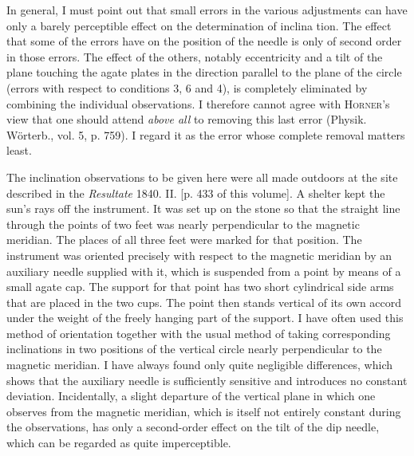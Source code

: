In general, I must point out that small errors in the various adjustments can have only a barely perceptible effect on the determination of inclina%
%
tion. The effect that some of the errors have on the position of the needle is only of second order in those errors. The effect of the others, notably eccentricity and a tilt of the plane touching the agate plates in the direction parallel to the plane of the circle (errors with respect to conditions 3, 6 and 4), is completely eliminated by combining the individual observations. I therefore cannot agree with \textsc{Horner}'s view that one should attend \textit{above all} to removing this last error (Physik. Wörterb., vol. 5, p. 759). I regard it as the error whose complete removal matters least.

The inclination observations to be given here were all made outdoors at the site described in the \textit{Resultate} 1840. II. [p. 433 of this volume]. A shelter kept the sun's rays off the instrument. It was set up on the stone so that the straight line through the points of two feet was nearly perpendicular to the magnetic meridian. The places of all three feet were marked for that position. The instrument was oriented precisely with respect to the magnetic meridian by an auxiliary needle supplied with it, which is suspended from a point by means of a small agate cap. The support for that point has two short cylindrical side arms that are placed in the two cups. The point then stands vertical of its own accord under the weight of the freely hanging part of the support. I have often used this method of orientation together with the usual method of taking corresponding inclinations in two positions of the vertical circle nearly perpendicular to the magnetic meridian. I have always found only quite negligible differences, which shows that the auxiliary needle is sufficiently sensitive and introduces no constant deviation. Incidentally, a slight departure of the vertical plane in which one observes from the magnetic meridian, which is itself not entirely constant during the observations, has only a second-order effect on the tilt of the dip needle, which can be regarded as quite imperceptible.

